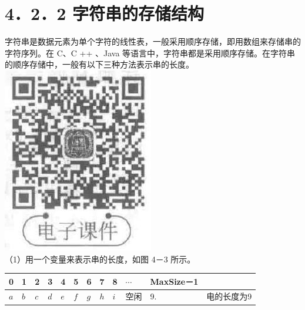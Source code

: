 \documentclass[10pt]{article}
\begin{document}
\section*{4．2．2 字符串的存储结构}
字符串是数据元素为单个字符的线性表，一般采用顺序存储，即用数组来存储串的字符序列。在 C、C ++ 、Java 等语言中，字符串都是采用顺序存储。在字符串的顺序存储中，一般有以下三种方法表示串的长度。\\
\includegraphics[max width=\textwidth, center]{2025_06_06_704745ea57b15b2333e5g-116}\\
（1）用一个变量来表示串的长度，如图 4－3 所示。

\begin{center}
\begin{tabular}{|l|l|l|l|l|l|l|l|l|l|l|l|}
0 & 1 & 2 & 3 & 4 & 5 & 6 & 7 & 8 & $\cdots$ & MaxSize－1 &  \\
\hline
$a$ & $b$ & $c$ & $d$ & $e$ & $f$ & $g$ & $h$ & $i$ & 空闲 & 9. & 电的长度为9 \\
\hline
\end{tabular}
\end{center}
\end{document}
